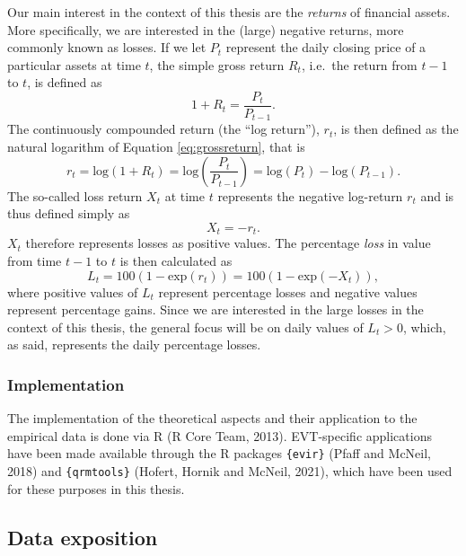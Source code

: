 \documentclass[a4paper,11pt]{article}
\theoremstyle{definition}
\theoremstyle{definition}
\theoremstyle{definition}
\theoremstyle{definition}
\theoremstyle{remark}
\begin{document}
Our main interest in the context of this thesis are the \emph{returns} of financial assets. More specifically, we are interested in the (large) negative returns, more commonly known as losses. If we let \(P_t\) represent the daily closing price of a particular assets at time \(t\), the simple gross return \(R_t\), i.e.~the return from \(t-1\) to \(t\), is defined as
\begin{equation}
1 + R_t = \frac{P_t}{P_{t-1}}.
\label{eq:grossreturn}
\end{equation}
The continuously compounded return (the ``log return''), \(r_t\), is then defined as the natural logarithm of Equation \eqref{eq:grossreturn}, that is
\begin{equation}
r_t = \text{log}(1 + R_t) = \text{log}(\frac{P_t}{P_{t-1}}) = \text{log}(P_t) - \text{log}(P_{t-1}).
\label{eq:logreturn}
\end{equation}
The so-called loss return \(X_t\) at time \(t\) represents the negative log-return \(r_t\) and is thus defined simply as
\begin{equation}
X_t = -r_t.
\label{eq:lossreturn}
\end{equation}
\(X_t\) therefore represents losses as positive values. The percentage \emph{loss} in value from time \(t-1\) to \(t\) is then calculated as
\begin{equation}
L_t = 100(1-\text{exp}(r_t)) = 100(1-\text{exp}(-X_t)),
\label{eq:percloss}
\end{equation}
where positive values of \(L_t\) represent percentage losses and negative values represent percentage gains. Since we are interested in the large losses in the context of this thesis, the general focus will be on daily values of \(L_t > 0\), which, as said, represents the daily percentage losses.

\hypertarget{implementation}{%
\subsubsection{Implementation}\label{implementation}}

The implementation of the theoretical aspects and their application to the empirical data is done via R (R Core Team, 2013). EVT-specific applications have been made available through the R packages \texttt{\{evir\}} (Pfaff and McNeil, 2018) and \texttt{\{qrmtools\}} (Hofert, Hornik and McNeil, 2021), which have been used for these purposes in this thesis.

\hypertarget{data-exposition}{%
\subsection{Data exposition}\label{data-exposition}}
\end{document}
